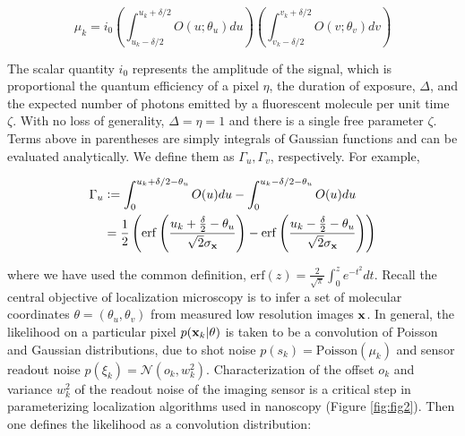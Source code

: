 \begin{equation}
\mu_{k} = i_{0}\left(\int_{u_{k}-\delta /2}^{u_{k}+\delta /2} O(u; \theta_{u})du \right)\left(\int_{v_{k}-\delta /2}^{v_{k}+\delta /2} O(v;\theta_{v})dv \right)
\end{equation}

The scalar quantity $i_{0}$ represents the amplitude of the signal, which is proportional the quantum efficiency of a pixel $\eta$, the duration of exposure, $\Delta$, and the expected number of photons emitted by a fluorescent molecule per unit time $\zeta$. With no loss of generality, $\Delta = \eta = 1$ and there is a single free parameter $\zeta$. Terms above in parentheses are simply integrals of Gaussian functions and can be evaluated analytically. We define them as $\Gamma_{u},\Gamma_{v}$, respectively. For example,

\begin{align*}
\Gamma_{u} &\vcentcolon =  \int_{0}^{u_{k}+\delta /2 - \theta_{u}} O(u)du - \int_{0}^{u_{k}-\delta /2 - \theta_{u}} O(u)du\\
&= \frac{1}{2}\left(\mathrm{erf}\left(\frac{u_{k}+\frac{\delta}{2}-\theta_{u}}{\sqrt{2}\sigma_{\bold{x}}}\right) -\mathrm{erf}\left(\frac{u_{k}-\frac{\delta}{2}-\theta_{u}}{\sqrt{2}\sigma_{\bold{x}}}\right)\right)
\end{align*}

where we have used the common definition, $\mathrm{erf}(z) = \frac{2}{\sqrt{\pi}}\int_{0}^{z}e^{-t^{2}}dt$. Recall the central objective of localization microscopy is to infer a set of molecular coordinates $\theta=(\theta_{u},\theta_{v})$ from measured low resolution images $\bold{x}$. In general, the likelihood on a particular pixel $p(\bold{x}_k\lvert\theta)$ is taken to be a convolution of Poisson and Gaussian distributions, due to shot noise $p(s_{k}) = \mathrm{Poisson}(\mu_{k})$ and sensor readout noise $p(\xi_{k}) = \mathcal{N}(o_{k},w_{k}^{2})$. Characterization of the offset $o_{k}$ and variance $w_{k}^{2}$ of the readout noise of the imaging sensor is a critical step in parameterizing localization algorithms used in nanoscopy (Figure \ref{fig:fig2}). Then one defines the likelihood as a convolution distribution:

